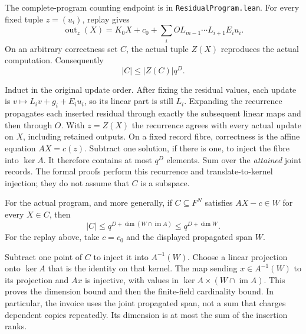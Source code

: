 \begin{theorem}\label{thm:residual-replay}
The complete-program counting endpoint is
 in \texttt{ResidualProgram.lean}.
For every fixed tuple $z=(u_i)$, replay gives
\[
 \operatorname{out}_z(X)=K_0X+c_0+
       \sum_i OL_{m-1}\cdots L_{i+1}E_i u_i.
\]
On an arbitrary correctness set $C$, the actual tuple $Z(X)$ reproduces the
actual computation. Consequently
\begin{equation}\label{eq:residual-record}
 |C|\le |Z(C)|q^D.
\end{equation}
\end{theorem}

\begin{outline}
Induct in the original update order. After fixing the residual values, each
update is $v\mapsto L_iv+g_i+E_i u_i$, so its linear part is still $L_i$.
Expanding the recurrence propagates each inserted residual through exactly
the subsequent linear maps and then through $O$. With $z=Z(X)$ the
recurrence agrees with every actual update on $X$, including retained
outputs. On a fixed record fibre, correctness is the affine equation
$AX=c(z)$. Subtract one solution, if there is one, to inject the fibre into
$\ker A$. It therefore contains at most $q^D$ elements. Sum over the
\emph{attained} joint records. The formal proofs perform this recurrence and
translate-to-kernel injection; they do not assume that $C$ is a subspace.
\end{outline}

\begin{theorem}\label{thm:residual-span}
For the actual program, and more generally, if $C\subseteq F^N$ satisfies $AX-c\in W$ for every $X\in C$,
then
\begin{equation}\label{eq:residual-span}
 |C|\le q^{D+\dim(W\cap\operatorname{im}A)}
       \le q^{D+\dim W}.
\end{equation}
For the replay above, take $c=c_0$ and the displayed propagated span $W$.
\end{theorem}

\begin{outline}
Subtract one point of $C$ to inject it into $A^{-1}(W)$. Choose a linear
projection onto $\ker A$ that is the identity on that kernel. The map sending
$x\in A^{-1}(W)$ to its projection and $Ax$ is injective, with values in
$\ker A\times(W\cap\operatorname{im}A)$. This proves the dimension bound
and then the finite-field cardinality bound. In particular, the invoice
uses the joint propagated span, not a sum that charges dependent copies
repeatedly. Its dimension is at most the sum of the insertion ranks.
\end{outline}

